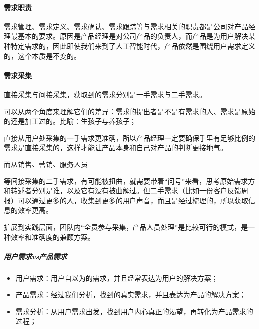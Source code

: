 \documentclass[letterpaper,10pt,english]{sphinxmanual}
\begin{document}
\paragraph{需求职责}
\label{\detokenize{chapter_introduction/need:id5}}
需求管理、需求定义、需求确认、需求跟踪等与需求相关的职责都是公司对产品经理最基本的要求。原因是产品经理是对公司产品的负责人，而产品是为用户解决某种特定需求的，因此即使我们来到了人工智能时代，产品依然是围绕用户需求定义的，这个本质是不变的。%
\begin{footnote}[29]\sphinxAtStartFootnote
{}
%
\end{footnote}


\paragraph{需求采集}
\label{\detokenize{chapter_introduction/need:id6}}
直接采集与间接采集，获取到的需求分别是一手需求与二手需求。

可以从两个角度来理解它们的差异：需求的提出者是不是有需求的人、需求是原始的还是加工过的。比喻：生孩子与养孩子；

直接从用户处采集的一手需求更准确，所以产品经理一定要确保手里有足够比例的需求是直接采集的，这样才能让产品本身和自己对产品的判断更接地气。

而从销售、营销、服务人员%
\begin{footnote}[30]\sphinxAtStartFootnote
{}
%
\end{footnote}等间接采集的二手需求，有可能被扭曲，就需要带着“问号”来看，思考原始需求方和转述者分别是谁，以及它有没有被曲解过。但二手需求（比如一份客户反馈周报）可以通过更多的人，收集到更多的用户声音，而且是经过梳理的，所以获取信息的效率更高。

扩展到实践层面，团队内“全员参与采集，产品人员处理”是比较可行的模式，是一种效率和准确度的兼顾方案。


\subparagraph{用户需求vs产品需求}
\label{\detokenize{chapter_introduction/need:vs}}\begin{itemize}
\item {} 
用户需求：用户自以为的需求，并且经常表达为用户的解决方案；

\item {} 
产品需求：经过我们分析，找到的真实需求，并且表达为产品的解决方案；

\item {} 
需求分析：从用户需求出发，找到用户内心真正的渴望，再转化为产品需求的过程；

\end{itemize}
\end{document}
